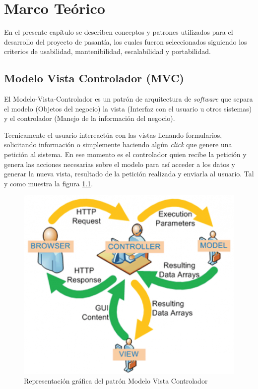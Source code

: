 \chapter{Marco Teórico}

En el presente capítulo se describen conceptos y patrones utilizados para el desarrollo del proyecto de pasantía, los cuales fueron seleccionados siguiendo los criterios de usabilidad, mantenibilidad, escalabilidad y portabilidad.

    \section{Modelo Vista Controlador (MVC)}
    
    El Modelo-Vista-Controlador es un patrón de arquitectura de \textit{software} que separa el modelo (Objetos del negocio) la vista (Interfaz con el usuario u otros sistemas) y el controlador (Manejo de la información del negocio)\cite{MVC-tiw}.
    
    Tecnicamente el usuario intereactúa con las vistas llenando formularios, solicitando información o simplemente haciendo algún \textit{click} que genere una petición al sistema. En ese momento es el controlador quien recibe la petición y genera las acciones necesarias sobre el modelo para así acceder a los datos y generar la nueva vista, resultado de la petición realizada y enviarla al usuario. Tal y como muestra la figura \ref{mvc-image}.
    
    \begin{figure}[htbp!]
        \begin{center}
            \includegraphics[width=.7\textwidth]{figures/mvc}
        \end{center}
        \caption{Representación gráfica del patrón Modelo Vista Controlador\cite{MVC-imagen}}
        \label{mvc-image}
    \end{figure}
    
